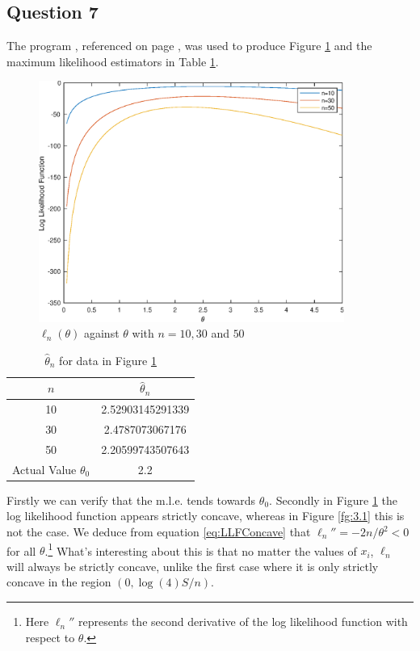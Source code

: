\documentclass[10pt,a4paper,notitlepage]{article}
\begin{document}
\subsection*{\centering Question 7}
The program , referenced on page \pageref{cd:7.1}, was used to produce Figure \ref{fg:7.1} and the maximum likelihood estimators in Table \ref{tb:Q7}.
\begin{figure}[H]
\centering
\includegraphics[width=10cm]{Image_7_1}
\caption{$\ell_{n}(\theta)$ against $\theta$ with $n=10,30$ and $50$}\label{fg:7.1}
\end{figure}
\begin{table}[H]
\centering
\begin{tabular}{|c|c|}
\hline $n$ & $\widehat{\theta}_{n}$ \\ \hline 10 & 2.52903145291339 \\ 30 & 2.4787073067176 \\ 50 & 2.20599743507643 \\ \hline Actual Value $\theta_{0}$ & 2.2 \\ \hline
\end{tabular}
\caption{$\widehat{\theta}_{n}$ for data in Figure \ref{fg:7.1}}
\label{tb:Q7}
\end{table}
Firstly we can verify that the m.l.e. tends towards $\theta_{0}$. Secondly in Figure \ref{fg:7.1} the log likelihood function appears strictly concave, whereas in Figure \ref{fg:3.1} this is not the case. We deduce from equation \eqref{eq:LLFConcave} that $\ell_{n}''=-2n/\theta^{2}<0$ for all $\theta$.\footnote{Here $\ell_{n}''$ represents the second derivative of the log likelihood function with respect to $\theta$.} What's interesting about this is that no matter the values of $x_{i}$, $\ell_{n}$ will always be strictly concave, unlike the first case where it is only strictly concave in the region $(0,\log(4)S/n)$.  
\end{document}
